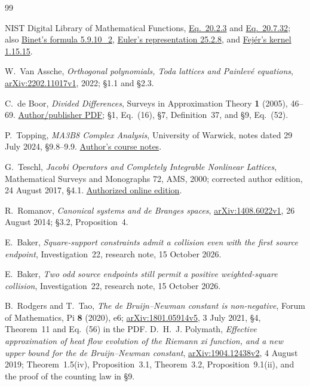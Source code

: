 \documentclass[11pt]{article}
\numberwithin{equation}{section}
\begin{document}
\begin{thebibliography}{99}
\raggedright
{}
NIST Digital Library of Mathematical Functions,
\href{https://dlmf.nist.gov/20.2.E3}{Eq.~20.2.3} and
\href{https://dlmf.nist.gov/20.7.E32}{Eq.~20.7.32};
also \href{https://dlmf.nist.gov/5.9.E10_2}{Binet's formula 5.9.10\_2},
\href{https://dlmf.nist.gov/25.2.E8}{Euler's representation 25.2.8},
and \href{https://dlmf.nist.gov/1.15.E15}{Fej\'er's kernel 1.15.15}.

W.~Van Assche, \emph{Orthogonal polynomials, Toda lattices and Painlev\'e
equations}, \href{https://arxiv.org/abs/2202.11017v1}{arXiv:2202.11017v1},
2022; \S1.1 and \S2.3.

C.~de Boor, \emph{Divided Differences}, Surveys in Approximation Theory
\textbf{1} (2005), 46--69.
\href{https://pages.cs.wisc.edu/~deboor/sat/papers/2/2.pdf}{Author/publisher PDF};
\S1, Eq.~(16), \S7, Definition~37, and \S9, Eq.~(52).

P.~Topping, \emph{MA3B8 Complex Analysis}, University of Warwick,
notes dated 29 July 2024, \S9.8--9.9.
\href{https://warwick.ac.uk/fac/sci/maths/people/staff/peter_topping/teaching/ma3b8_cplxanal_24_07_29.pdf}{Author's course notes}.

G.~Teschl, \emph{Jacobi Operators and Completely Integrable Nonlinear
Lattices}, Mathematical Surveys and Monographs 72, AMS, 2000;
corrected author edition, 24 August 2017, \S4.1.
\href{https://www.mat.univie.ac.at/~gerald/ftp/book-jac/jacop.pdf}{Authorized online edition}.

R.~Romanov, \emph{Canonical systems and de Branges spaces},
\href{https://arxiv.org/abs/1408.6022v1}{arXiv:1408.6022v1},
26 August 2014; \S3.2, Proposition~4.

E.~Baker, \emph{Square-support constraints admit a collision even with the
first source endpoint}, Investigation~22, research note, 15 October 2026.

E.~Baker, \emph{Two odd source endpoints still permit a positive weighted-square
collision}, Investigation~22, research note, 15 October 2026.

B.~Rodgers and T.~Tao, \emph{The de Bruijn--Newman constant is non-negative},
Forum of Mathematics, Pi \textbf{8} (2020), e6;
\href{https://arxiv.org/abs/1801.05914v5}{arXiv:1801.05914v5},
3 July 2021, \S4, Theorem~11 and Eq.~(56) in the PDF.
D.~H.~J. Polymath, \emph{Effective approximation of heat flow evolution
of the Riemann xi function, and a new upper bound for the de
Bruijn--Newman constant},
\href{https://arxiv.org/abs/1904.12438v2}{arXiv:1904.12438v2},
4 August 2019; Theorem~1.5(iv), Proposition~3.1, Theorem~3.2,
Proposition~9.1(ii), and the proof of the counting law in \S9.


\end{thebibliography}
\end{document}
